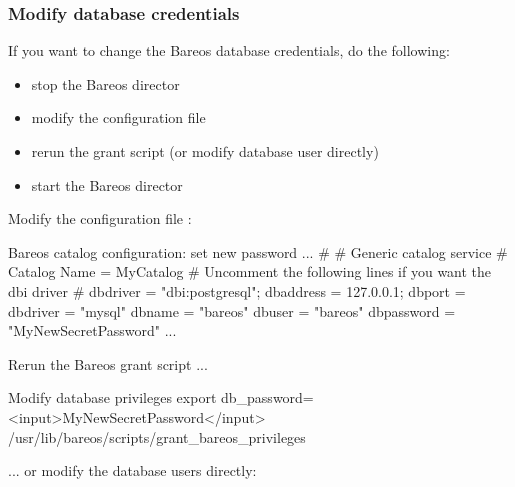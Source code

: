 \subsubsection{Modify database credentials}

If you want to change the Bareos database credentials, do the following:

\begin{itemize}
    \item stop the Bareos director
    \item modify the configuration file \configFileDirUnix
    \item rerun the grant script  (or modify database user directly)
    \item start the Bareos director
\end{itemize}

Modify the configuration file \configFileDirUnix:

\begin{bconfig}{Bareos catalog configuration: set new password}
...
#
# Generic catalog service
#
Catalog {
  Name = MyCatalog
  # Uncomment the following lines if you want the dbi driver
  # dbdriver = "dbi:postgresql"; dbaddress = 127.0.0.1; dbport =  
  dbdriver = "mysql"
  dbname = "bareos"
  dbuser = "bareos"
  dbpassword = "MyNewSecretPassword"
}
...
\end{bconfig}

Rerun the Bareos grant script  ...

\begin{commands}{Modify database privileges}
export db_password=<input>MyNewSecretPassword</input>
/usr/lib/bareos/scripts/grant_bareos_privileges
\end{commands}

... or modify the database users directly:

